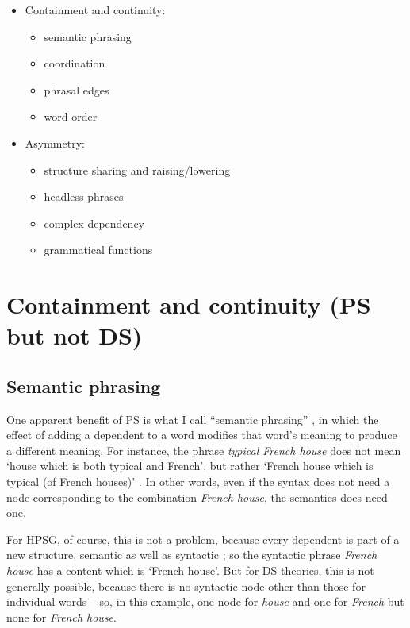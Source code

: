 \documentclass[output=paper
 	        ,biblatex
                ,babelshorthands
                ,newtxmath
                ,draftmode
                ,colorlinks, citecolor=brown
]{langscibook}
\begin{document}
\begin{itemize}
	\item  Containment and continuity:
	\begin{itemize}
		\item semantic phrasing
		
		\item coordination
		
		\item phrasal edges
		
		\item word order
	\end{itemize}

	\item Asymmetry:
	\begin{itemize}
		\item structure sharing and raising/lowering
		
		\item headless phrases
		
		\item complex dependency
		
		\item grammatical functions
	\end{itemize}
\end{itemize}


\section{Containment and continuity (PS but not DS)}
\label{sec:4}

\subsection{Semantic phrasing}
\label{sec:4.1}

One apparent benefit of PS is what I call ``semantic phrasing'' \citep[146–151]{Hudson90a-u}, in
which the effect of adding a dependent to a word modifies that word's meaning to produce a different
meaning. For instance, the phrase \emph{typical French house} does not mean `house which is both
typical and French', but rather `French house which is typical (of French houses)'
\citep[]{Dahl80a}. In other words, even if the syntax does not need a node corresponding to the
combination \emph{French house}, the semantics does need one.

For HPSG, of course, this is not a problem, because every dependent is part of a new structure,
semantic as well as syntactic \citep{MuellerEvaluating}; so the syntactic phrase \emph{French house}
has a content which is `French house'. But for DS theories, this is not generally possible, because
there is no syntactic node other than those for individual words – so, in this example, one node for
\emph{house} and one for \emph{French} but none for \emph{French house}.
\end{document}
